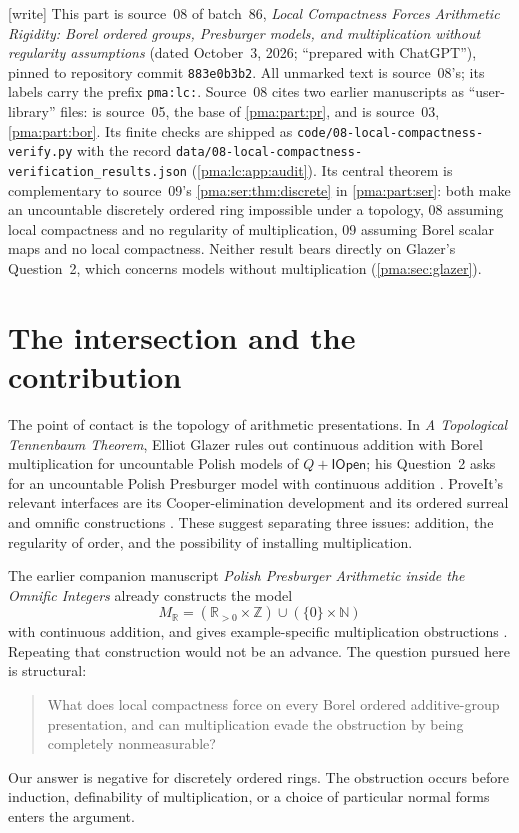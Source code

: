 \documentclass[11pt]{article}
\numberwithin{equation}{section}
\theoremstyle{definition}
\theoremstyle{remark}
\newcommand{\N}{\mathbb N}
\newcommand{\Z}{\mathbb Z}
\newcommand{\R}{\mathbb R}
\newcommand{\IOpen}{\mathsf{IOpen}}
\newcommand{\writetag}{\textup{\textsf{\small[write]}}}
\newcommand{\fn}[1]{\nolinkurl{#1}}
\begin{document}
\noindent\writetag{} This part is source~08 of batch~86, \emph{Local
Compactness Forces Arithmetic Rigidity: Borel ordered groups, Presburger
models, and multiplication without regularity assumptions} (dated
October~3, 2026; ``prepared with ChatGPT''), pinned to repository commit
\texttt{883e0b3b2}. All unmarked text is source~08's; its labels carry the
prefix \texttt{pma:lc:}. Source~08 cites two earlier manuscripts as
``user-library'' files: \cite{s08:PriorPres} is source~05, the base of
\cref{pma:part:pr}, and \cite{s08:PriorBorel} is source~03,
\cref{pma:part:bor}. Its finite checks are shipped as
\fn{code/08-local-compactness-verify.py} with the record
\fn{data/08-local-compactness-verification_results.json}
(\cref{pma:lc:app:audit}). Its central theorem is complementary to source~09's
\cref{pma:ser:thm:discrete} in \cref{pma:part:ser}: both make an uncountable
discretely ordered ring impossible under a topology, 08 assuming local
compactness and no regularity of multiplication, 09 assuming Borel scalar
maps and no local compactness. Neither result bears directly on Glazer's
Question~2, which concerns models without multiplication
(\cref{pma:sec:glazer}).

\section{The intersection and the contribution}
\label{pma:lc:sec:intersection}

The point of contact is the topology of arithmetic presentations. In
\emph{A Topological Tennenbaum Theorem}, Elliot Glazer rules out continuous
addition with Borel multiplication for uncountable Polish models of
$Q+\IOpen$; his Question~2 asks for an uncountable Polish Presburger model
with continuous addition \cite[Corollary~1 and Question~2]{Glazer}.
ProveIt's relevant interfaces are its Cooper-elimination development and
its ordered surreal and omnific constructions \cite{s08:RepoPres,s08:RepoSurreal}.
These suggest separating three issues: addition, the regularity of order,
and the possibility of installing multiplication.

The earlier companion manuscript \emph{Polish Presburger Arithmetic inside
the Omnific Integers} already constructs the model
\begin{equation}\label{pma:lc:eq:realmodel}
 M_{\R}=(\R_{>0}\times\Z)\cup(\{0\}\times\N)
\end{equation}
with continuous addition, and gives example-specific multiplication
obstructions \cite{s08:PriorPres}. Repeating that construction would not be an
advance. The question pursued here is structural:
\begin{quote}
What does local compactness force on every Borel ordered additive-group
presentation, and can multiplication evade the obstruction by being
completely nonmeasurable?
\end{quote}
Our answer is negative for discretely ordered rings. The obstruction occurs
before induction, definability of multiplication, or a choice of particular
normal forms enters the argument.
\end{document}
